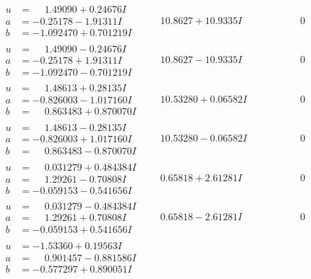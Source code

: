 \documentclass[1p]{elsarticle_modified}
\theoremstyle{definition}
\begin{document}
$$\begin{array}{c|c|c}
\begin{aligned}
u &= \phantom{-}1.49090 + 0.24676 I \\
a &= -0.25178 - 1.91311 I \\
b &= -1.092470 + 0.701219 I\end{aligned}
 & \phantom{-}10.8627 + 10.9335 I & \phantom{-0.000000 } 0 \\ \hline\begin{aligned}
u &= \phantom{-}1.49090 - 0.24676 I \\
a &= -0.25178 + 1.91311 I \\
b &= -1.092470 - 0.701219 I\end{aligned}
 & \phantom{-}10.8627 - 10.9335 I & \phantom{-0.000000 } 0 \\ \hline\begin{aligned}
u &= \phantom{-}1.48613 + 0.28135 I \\
a &= -0.826003 - 1.017160 I \\
b &= \phantom{-}0.863483 + 0.870070 I\end{aligned}
 & \phantom{-}10.53280 + 0.06582 I & \phantom{-0.000000 } 0 \\ \hline\begin{aligned}
u &= \phantom{-}1.48613 - 0.28135 I \\
a &= -0.826003 + 1.017160 I \\
b &= \phantom{-}0.863483 - 0.870070 I\end{aligned}
 & \phantom{-}10.53280 - 0.06582 I & \phantom{-0.000000 } 0 \\ \hline\begin{aligned}
u &= \phantom{-}0.031279 + 0.484384 I \\
a &= \phantom{-}1.29261 - 0.70808 I \\
b &= -0.059153 - 0.541656 I\end{aligned}
 & \phantom{-}0.65818 + 2.61281 I & \phantom{-0.000000 } 0 \\ \hline\begin{aligned}
u &= \phantom{-}0.031279 - 0.484384 I \\
a &= \phantom{-}1.29261 + 0.70808 I \\
b &= -0.059153 + 0.541656 I\end{aligned}
 & \phantom{-}0.65818 - 2.61281 I & \phantom{-0.000000 } 0 \\ \hline\begin{aligned}
u &= -1.53360 + 0.19563 I \\
a &= \phantom{-}0.901457 - 0.881586 I \\
b &= -0.577297 + 0.890051 I\end{aligned}

\end{array}$$
\end{document}
